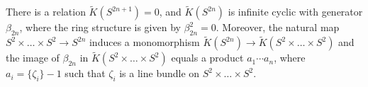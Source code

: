There is a relation $\tilde{K}(S^{2n+1}) = 0$, and $\tilde{K}(S^{2n})$ is infinite cyclic with generator $\beta_{2n}$, where the ring structure is given by $\beta_{2n}^2 = 0$. Moreover, the natural map $S^2 \times \dots \times S^2 \to S^{2n}$ induces a monomorphism $\tilde{K}(S^{2n}) \to \tilde{K}(S^2 \times \dots \times S^2)$ and the image of $\beta_{2n}$ in $\tilde{K}(S^2 \times \dots \times S^2)$ equals a product $a_1 \cdots a_n$, where $a_i = \{ \zeta_i \} - 1$ such that $\zeta_i$ is a line bundle on $S^2 \times \dots \times S^2$.
